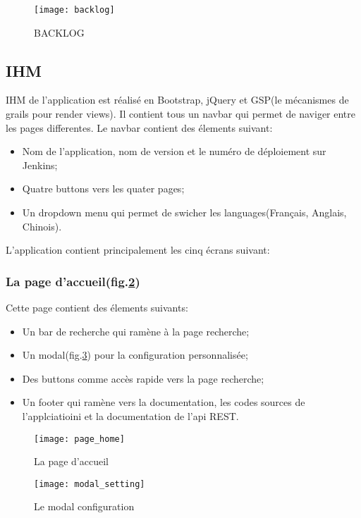 \begin{figure}[ht]
 \centering
 \texttt{[image: backlog]}
 \caption{BACKLOG}
 \label{fig:backlog}
\end{figure}

\subsection{IHM}
IHM de l'application est réalisé en Bootstrap, jQuery et GSP(le mécanismes de grails pour render views).
Il contient tous un navbar qui permet de naviger entre les pages differentes.
Le navbar contient des élements suivant:
\begin{itemize}
 \item Nom de l'application, nom de version et le numéro de déploiement sur Jenkins;
 \item Quatre buttons vers les quater pages;
 \item Un dropdown menu qui permet de swicher les languages(Français, Anglais, Chinois).
\end{itemize}

L'application contient principalement les cinq écrans suivant:

\subsubsection{La page d'accueil(fig.\ref{fig:page_home})}
Cette page contient des élements suivants:
\begin{itemize}
 \item Un bar de recherche qui ramène à la page recherche;
 \item Un modal(fig.\ref{fig:modal_setting}) pour la configuration personnalisée;
 \item Des buttons comme accès rapide vers la page recherche;
 \item Un footer qui ramène vers la documentation, les codes sources de l'applciatioini et la documentation de l'api REST.
\end{itemize}

\begin{figure}[ht]
 \centering
 \texttt{[image: page\_home]}
 \caption{La page d'accueil}
 \label{fig:page_home}
\end{figure}

\begin{figure}[ht]
 \centering
 \texttt{[image: modal\_setting]}
 \caption{Le modal configuration}
 \label{fig:modal_setting}
\end{figure}

